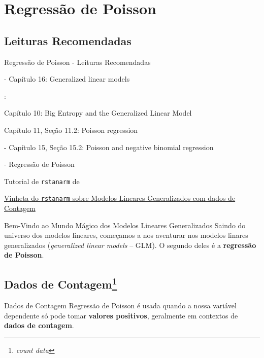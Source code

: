 \section{Regressão de Poisson}

\subsection{Leituras Recomendadas}
\begin{frame}{Regressão de Poisson - Leituras Recomendadas}
	\begin{vfilleditems}
		\item \textcite{gelman2013bayesian} - Capítulo 16: Generalized linear models
		\item \textcite{mcelreath2020statistical}:
		\begin{vfilleditems}
			\item Capítulo 10: Big Entropy and the Generalized Linear Model
			\item Capítulo 11, Seção 11.2: Poisson regression
		\end{vfilleditems}
		\item \textcite{gelman2020regression} - Capítulo 15, Seção 15.2: Poisson and negative binomial regression
		\item \textcite{storopoli2021estatisticabayesianaR} - Regressão de Poisson
		\item Tutorial de \texttt{rstanarm} de \textcite{muth2018user}
		\item \href{http://mc-stan.org/rstanarm/articles/count.html}{Vinheta do \texttt{rstanarm} sobre Modelos Lineares Generalizados com dados de Contagem}
	\end{vfilleditems}
\end{frame}

\begin{frame}{Bem-Vindo ao Mundo Mágico dos Modelos Lineares Generalizados}
	Saindo do universo dos modelos lineares, começamos a nos aventurar nos modelos
	linares generalizados (\textit{generalized linear models} -- GLM).
	\vfill
	O segundo deles é a \textbf{regressão de Poisson}.
\end{frame}

\subsection{Dados de Contagem\footnote{\textit{count data}}}
\begin{frame}{Dados de Contagem}
	Regressão de Poisson é usada quando a nossa variável dependente só pode
	tomar \textbf{valores positivos}, geralmente em contextos de
	\textbf{dados de contagem}.
\end{frame}

